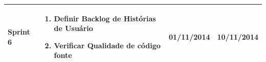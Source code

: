 \begin{table}
\begin{center}
\begin{tabular}{  | p{2cm} | p{8cm} | p{2cm}| p{2cm} |}
    Sprint 6 & \begin{enumerate}
    \item Definir Backlog de Histórias de Usuário
    \item Verificar Qualidade de código fonte
    \end{enumerate} & 01/11/2014 & 10/11/2014\\ \hline
    \end{tabular}    
\end{center}
\label{cronograma}
\end{table}
